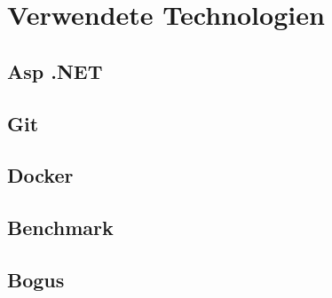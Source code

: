 \section{Verwendete Technologien}

\subsection*{Asp .NET}



\subsection*{Git}



\subsection*{Docker}



\subsection*{Benchmark}



\subsection*{Bogus}